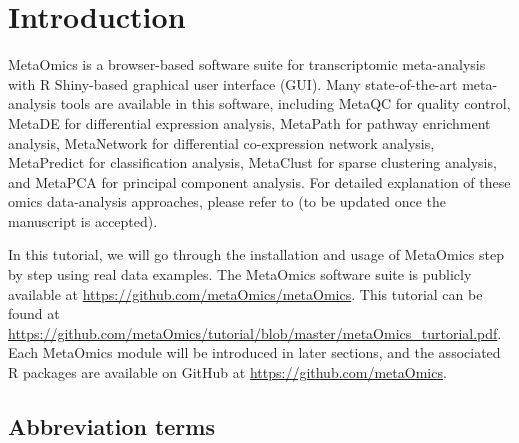 \section{Introduction}
 
MetaOmics is a browser-based software suite for transcriptomic meta-analysis with R Shiny-based graphical user interface (GUI).
Many state-of-the-art meta-analysis tools are available in this software,
including %
MetaQC for quality control, 
MetaDE for differential expression analysis,
MetaPath for pathway enrichment analysis,
MetaNetwork for differential co-expression network analysis,
MetaPredict for classification analysis,
MetaClust for sparse clustering analysis, 
and MetaPCA for principal component analysis.
For detailed explanation of these omics data-analysis approaches, 
please refer to (to be updated once the manuscript is accepted).


In this tutorial, 
we will go through the installation and usage of MetaOmics step by step using real data examples.
The MetaOmics software suite is publicly available at \url{https://github.com/metaOmics/metaOmics}.
This tutorial can be found at \url{https://github.com/metaOmics/tutorial/blob/master/metaOmics_turtorial.pdf}.
Each MetaOmics module will be introduced in later sections, 
and the associated R packages are available on GitHub at \url{https://github.com/metaOmics}.


\subsection{Abbreviation terms}
\label{AbbreviationTerms}


